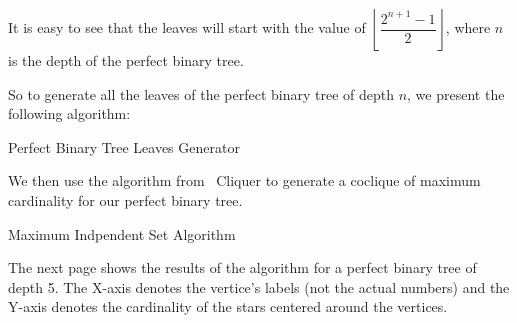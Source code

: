 \documentclass[11pt,a4paper]{article}
\theoremstyle{definition}
\begin{document}
It is easy to see that the leaves will start with the value of $\left\lfloor\dfrac{2^{n + 1} - 1}{2}\right\rfloor$, where $n$ is the depth of the perfect binary tree.

\newpage
So to generate all the leaves of the perfect binary tree of depth $n$, we present the following algorithm:

\begin{algorithm}[hbt!]
	\caption{Perfect Binary Tree Leaves Generator}\label{alg:leaves-generator}


\end{algorithm}

We then use the algorithm from ~\cite{Niskanen2003CliquerUG}Cliquer to generate a coclique of maximum cardinality for our perfect binary tree.

\begin{algorithm}[hbt!]
	\caption{Maximum Indpendent Set Algorithm}\label{alg:max-independent-set}


\end{algorithm}

The next page shows the results of the algorithm for a perfect binary tree of depth 5. The X-axis denotes the vertice's labels (not the actual numbers) and the Y-axis denotes the cardinality of the stars centered around the vertices.
\end{document}
